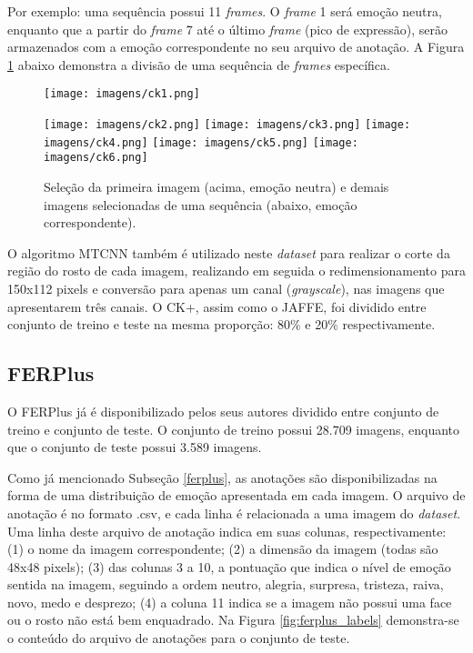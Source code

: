 \documentclass[
12pt,       %
openright,      %
oneside,      %
a4paper,      %
english,      %
french,       %
spanish,      %
brazil        %
]{abntex2}
\begin{document}
Por exemplo: uma sequência possui 11 \textit{frames}. O \textit{frame} 1 será emoção neutra, enquanto que a partir do \textit{frame} 7 até o último \textit{frame} (pico de expressão), serão armazenados com a emoção correspondente no seu arquivo de anotação. A Figura \ref{fig:ck+_group} abaixo demonstra a divisão de uma sequência de \textit{frames} específica.

\begin{figure}[ht]
\centering
\caption{Seleção da primeira imagem (acima, emoção neutra) e demais imagens selecionadas de uma sequência (abaixo, emoção correspondente).}
\texttt{[image: imagens/ck1.png]}

\texttt{[image: imagens/ck2.png]}
\texttt{[image: imagens/ck3.png]}
\texttt{[image: imagens/ck4.png]}
\texttt{[image: imagens/ck5.png]}
\texttt{[image: imagens/ck6.png]}
\label{fig:ck+_group}
\end{figure}

O algoritmo MTCNN também é utilizado neste \textit{dataset} para realizar o corte da região do rosto de cada imagem, realizando em seguida o redimensionamento para 150x112 pixels e conversão para apenas um canal (\textit{grayscale}), nas imagens que apresentarem três canais. O CK+, assim como o JAFFE, foi dividido entre conjunto de treino e teste na mesma proporção: 80\% e 20\% respectivamente.

\subsection{FERPlus} \label{preprocessamento-ferplus}

O FERPlus já é disponibilizado pelos seus autores dividido entre conjunto de treino e conjunto de teste. O conjunto de treino possui 28.709 imagens, enquanto que o conjunto de teste possui 3.589 imagens.

Como já mencionado Subseção \ref{ferplus}, as anotações são disponibilizadas na forma de uma distribuição de emoção apresentada em cada imagem. O arquivo de anotação é no formato .csv, e cada linha é relacionada a uma imagem do \textit{dataset}. Uma linha deste arquivo de anotação indica em suas colunas, respectivamente: (1) o nome da imagem correspondente; (2) a dimensão da imagem (todas são 48x48 pixels); (3) das colunas 3 a 10, a pontuação que indica o nível de emoção sentida na imagem, seguindo a ordem neutro, alegria, surpresa, tristeza, raiva, novo, medo e desprezo; (4) a coluna 11 indica se a imagem não possui uma face ou o rosto não está bem enquadrado. Na Figura \ref{fig:ferplus_labels} demonstra-se o conteúdo do arquivo de anotações para o conjunto de teste.
\end{document}
